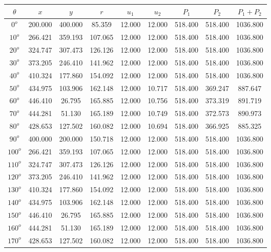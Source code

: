     \singlespacing
    \begin{table}[H]
        \centering
        \begin{tabular}{|c|c|c|c|c|c|c|c|c|} \hline
    $\theta$ &$x$ &$y$ &$r$ &$u_1$ &$u_2$ &$P_1$ &$P_2$ &$P_1+P_2$ \\ \hline
$0^o$	&200.000	&400.000	&85.359	&12.000	&12.000	&518.400	&518.400	&1036.800 \\ \hline
$10^o$	&266.421	&359.193	&107.065	&12.000	&12.000	&518.400	&518.400	&1036.800 \\ \hline
$20^o$	&324.747	&307.473	&126.126	&12.000	&12.000	&518.400	&518.400	&1036.800 \\ \hline
$30^o$	&373.205	&246.410	&141.962	&12.000	&12.000	&518.400	&518.400	&1036.800 \\ \hline
$40^o$	&410.324	&177.860	&154.092	&12.000	&12.000	&518.400	&518.400	&1036.800 \\ \hline
$50^o$	&434.975	&103.906	&162.148	&12.000	&10.717	&518.400	&369.247	&887.647 \\ \hline
$60^o$	&446.410	&26.795	&165.885	&12.000	&10.756	&518.400	&373.319	&891.719 \\ \hline
$70^o$	&444.281	&51.130	&165.189	&12.000	&10.749	&518.400	&372.573	&890.973 \\ \hline
$80^o$	&428.653	&127.502	&160.082	&12.000	&10.694	&518.400	&366.925	&885.325 \\ \hline
$90^o$	&400.000	&200.000	&150.718	&12.000	&12.000	&518.400	&518.400	&1036.800 \\ \hline
$100^o$	&266.421	&359.193	&107.065	&12.000	&12.000	&518.400	&518.400	&1036.800 \\ \hline
$110^o$	&324.747	&307.473	&126.126	&12.000	&12.000	&518.400	&518.400	&1036.800 \\ \hline
$120^o$	&373.205	&246.410	&141.962	&12.000	&12.000	&518.400	&518.400	&1036.800 \\ \hline
$130^o$	&410.324	&177.860	&154.092	&12.000	&12.000	&518.400	&518.400	&1036.800 \\ \hline
$140^o$	&434.975	&103.906	&162.148	&12.000	&12.000	&518.400	&518.400	&1036.800 \\ \hline
$150^o$	&446.410	&26.795	&165.885	&12.000	&12.000	&518.400	&518.400	&1036.800 \\ \hline
$160^o$	&444.281	&51.130	&165.189	&12.000	&12.000	&518.400	&518.400	&1036.800 \\ \hline
$170^o$	&428.653	&127.502	&160.082	&12.000	&12.000	&518.400	&518.400	&1036.800 \\ \hline

\end{tabular}
\end{table}
